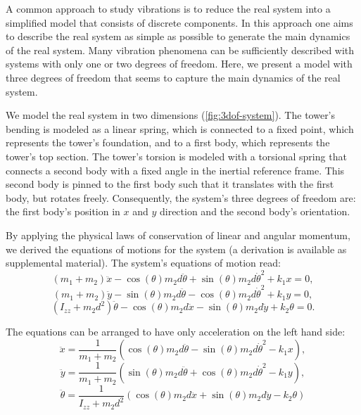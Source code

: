 \documentclass{article}
\begin{document}
A common approach to study vibrations is to reduce the real system into a simplified model that consists of discrete components. In this approach one aims to describe the real system as simple as possible to generate the main dynamics of the real system. Many vibration phenomena can be sufficiently described with systems with only one or two degrees of freedom. Here, we present a model with three degrees of freedom that seems to capture the main dynamics of the real system.
\par 
We model the real system in two dimensions (\autoref{fig:3dof-system}). The tower's bending is modeled as a linear spring, which is connected to a fixed point, which represents the tower's foundation, and to a first body, which represents the tower's top section. The tower's torsion is modeled with a torsional spring that connects a second body with a fixed angle in the inertial reference frame. This second body is pinned to the first body such that it translates with the first body, but rotates freely. Consequently, the system's three degrees of freedom are: the first body's position in $x$ and $y$ direction and the second body's orientation.
\par 
By applying the physical laws of conservation of linear and angular momentum, we derived the equations of motions for the system (a derivation is available as supplemental material). The system's equations of motion read:
\begin{equation}
    (m_1 + m_2) \ddot{x} - \cos(\theta) m_2 d \ddot{\theta} + \sin(\theta) m_2 d \dot{\theta}^2 + k_1 x = 0,\label{eq:eom-x}
\end{equation}
\begin{equation}
    (m_1 + m_2) \ddot{y} - \sin(\theta) m_2 d \ddot{\theta} - \cos(\theta) m_2 d \dot{\theta}^2 + k_1 y = 0,\label{eq:eom-y}
\end{equation}
\begin{equation}
    (I_{zz} + m_2 d^2)\ddot{\theta} - \cos(\theta) m_2 d \ddot{x} - \sin(\theta)m_2 d \ddot{y} + k_2 \theta = 0.\label{eq:eom-theta}
\end{equation}

The equations can be arranged to have only acceleration on the left hand side:
\begin{equation}
    \ddot{x} = \frac{1}{m_1 + m_2} \left( \cos(\theta) m_2 d \ddot{\theta} - \sin(\theta) m_2 d \dot{\theta}^2 - k_1 x \right),\label{eq:eom2-x}
\end{equation}
\begin{equation}
   \ddot{y} = \frac{1}{m_1 + m_2} \left(\sin(\theta) m_2 d \ddot{\theta} + \cos(\theta) m_2 d \dot{\theta}^2 - k_1 y \right),\label{eq:eom2-y}
\end{equation}
\begin{equation}
    \ddot{\theta} = \frac{1}{I_{zz} + m_2 d^2} \left(\cos(\theta) m_2 d \ddot{x} + \sin(\theta)m_2 d \ddot{y} - k_2 \theta \right) \label{eq:eom2-theta}
\end{equation}
\end{document}
